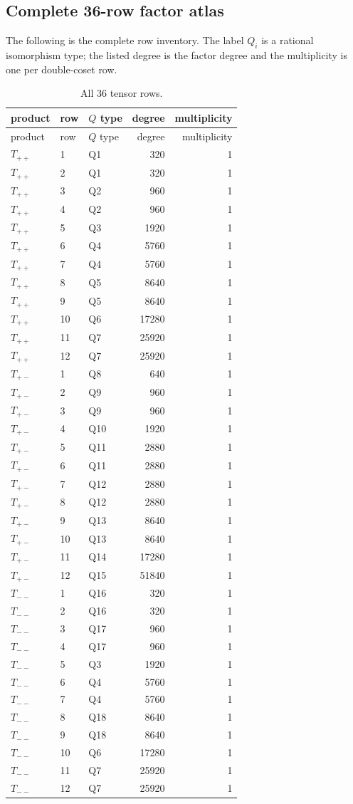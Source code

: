 \documentclass[11pt]{article}
\begin{document}
\subsection{Complete 36-row factor atlas}
The following is the complete row inventory.  The label $Q_i$ is a rational isomorphism type;
the listed degree is the factor degree and the multiplicity is one per double-coset row.
\begin{longtable}{@{}lllrr@{}}
\caption{All 36 tensor rows.}\label{tab:36}\\
\toprule
product & row & $Q$ type & degree & multiplicity\\\midrule
\endfirsthead\toprule product & row & $Q$ type & degree & multiplicity\\\midrule\endhead
$T_{++}$&1&Q1&320&1\\ $T_{++}$&2&Q1&320&1\\ $T_{++}$&3&Q2&960&1\\
$T_{++}$&4&Q2&960&1\\ $T_{++}$&5&Q3&1920&1\\ $T_{++}$&6&Q4&5760&1\\
$T_{++}$&7&Q4&5760&1\\ $T_{++}$&8&Q5&8640&1\\ $T_{++}$&9&Q5&8640&1\\
$T_{++}$&10&Q6&17280&1\\ $T_{++}$&11&Q7&25920&1\\ $T_{++}$&12&Q7&25920&1\\
$T_{+-}$&1&Q8&640&1\\ $T_{+-}$&2&Q9&960&1\\ $T_{+-}$&3&Q9&960&1\\
$T_{+-}$&4&Q10&1920&1\\ $T_{+-}$&5&Q11&2880&1\\ $T_{+-}$&6&Q11&2880&1\\
$T_{+-}$&7&Q12&2880&1\\ $T_{+-}$&8&Q12&2880&1\\ $T_{+-}$&9&Q13&8640&1\\
$T_{+-}$&10&Q13&8640&1\\ $T_{+-}$&11&Q14&17280&1\\ $T_{+-}$&12&Q15&51840&1\\
$T_{--}$&1&Q16&320&1\\ $T_{--}$&2&Q16&320&1\\ $T_{--}$&3&Q17&960&1\\
$T_{--}$&4&Q17&960&1\\ $T_{--}$&5&Q3&1920&1\\ $T_{--}$&6&Q4&5760&1\\
$T_{--}$&7&Q4&5760&1\\ $T_{--}$&8&Q18&8640&1\\ $T_{--}$&9&Q18&8640&1\\
$T_{--}$&10&Q6&17280&1\\ $T_{--}$&11&Q7&25920&1\\ $T_{--}$&12&Q7&25920&1\\
\bottomrule
\end{longtable}
\end{document}
